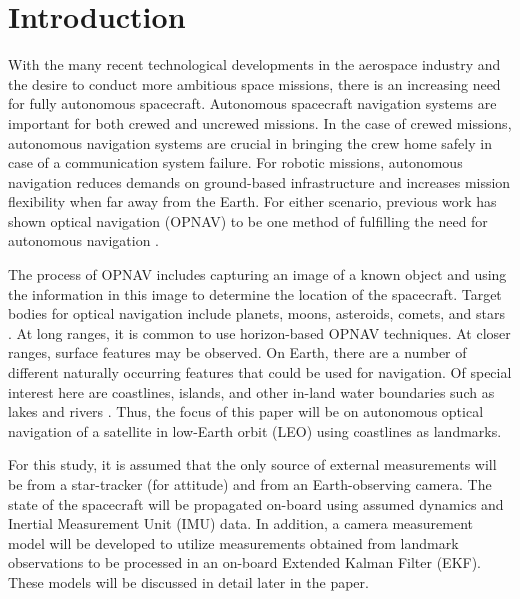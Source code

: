 \documentclass[]{aiaa-tc}%
\begin{document}
\section{Introduction}
With the many recent technological developments in the aerospace industry and the desire to conduct more ambitious space missions, there is an increasing need for fully autonomous spacecraft.  Autonomous spacecraft navigation systems are important for both crewed and uncrewed missions.  In the case of crewed missions, autonomous navigation systems are crucial in bringing the crew home safely in case of a communication system failure.  For robotic missions, autonomous navigation reduces demands on ground-based infrastructure and increases mission flexibility when far away from the Earth.  For either scenario, previous work has shown optical navigation (OPNAV) to be one method of fulfilling the need for autonomous navigation \cite{Christian:2012}.

The process of OPNAV includes capturing an image of a known object and using the information in this image to determine the location of the spacecraft.  Target bodies for optical navigation include planets, moons, asteroids, comets, and stars \cite{Owen:2011}.  At long ranges, it is common to use horizon-based OPNAV techniques.  At closer ranges, surface features may be observed.  On Earth, there are a number of different naturally occurring features that could be used for navigation.  Of special interest here are coastlines, islands, and other in-land water boundaries such as lakes and rivers \cite{Liu:2004}.  Thus, the focus of this paper will be on autonomous optical navigation of a satellite in low-Earth orbit (LEO) using coastlines as landmarks.  

For this study, it is assumed that the only source of external measurements will be from a star-tracker (for attitude) and from an Earth-observing camera.  The state of the spacecraft will be propagated on-board using assumed dynamics and Inertial Measurement Unit (IMU) data.  In addition, a camera measurement model will be developed to utilize measurements obtained from landmark observations to be processed in an on-board Extended Kalman Filter (EKF).  These models will be discussed in detail later in the paper.

\end{document}
